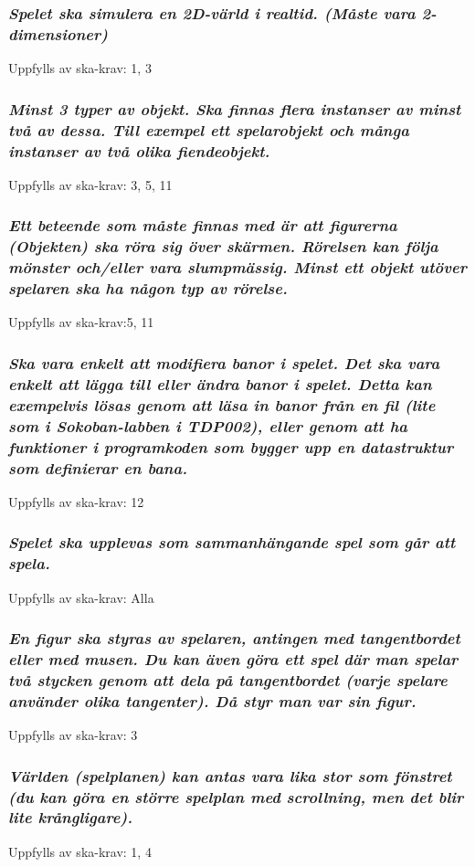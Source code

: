 \documentclass{TDP005mall}
\begin{document}
\subsubsection{\emph{ Spelet ska simulera en 2D-värld i realtid. (Måste vara 2-dimensioner)}}
Uppfylls av ska-krav: 1, 3

\subsubsection{\emph{ Minst 3 typer av objekt. Ska finnas flera instanser av minst två av dessa. Till exempel ett spelarobjekt och många instanser av två olika fiendeobjekt.}}
Uppfylls av ska-krav: 3, 5, 11

\subsubsection{\emph{ Ett beteende som måste finnas med är att figurerna (Objekten) ska röra sig över skärmen. Rörelsen kan följa mönster och/eller vara slumpmässig. Minst ett objekt utöver spelaren ska ha någon typ av rörelse.}}
Uppfylls av ska-krav:5, 11

\subsubsection{\emph{ Ska vara enkelt att modifiera banor i spelet. Det ska vara enkelt att lägga till eller ändra banor i spelet. Detta kan exempelvis lösas genom att läsa in banor från en fil (lite som i Sokoban-labben i TDP002), eller genom att ha funktioner i programkoden som bygger upp en datastruktur som definierar en bana. }}
Uppfylls av ska-krav: 12

\subsubsection{\emph{ Spelet ska upplevas som sammanhängande spel som går att spela.}}
Uppfylls av ska-krav: Alla

\subsubsection{\emph{ En figur ska styras av spelaren, antingen med tangentbordet eller med musen. Du kan även göra ett spel där man spelar två stycken genom att dela på tangentbordet (varje spelare använder olika tangenter). Då styr man var sin figur.}}
Uppfylls av ska-krav: 3

\subsubsection{\emph{ Världen (spelplanen) kan antas vara lika stor som fönstret (du kan göra en större spelplan med scrollning, men det blir lite krångligare).}}
Uppfylls av ska-krav: 1, 4
\end{document}
